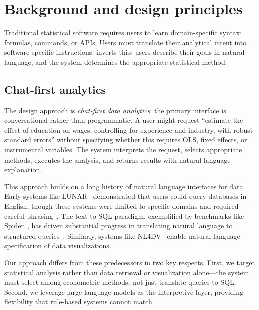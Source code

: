 
\section{Background and design principles} \label{sec:design}

Traditional statistical software requires users to learn domain-specific syntax:
 formulas,  commands, or  APIs.
Users must translate their analytical intent into software-specific instructions.
 inverts this: users describe their goals in natural
language, and the system determines the appropriate statistical method.

\subsection{Chat-first analytics}

The design approach is \emph{chat-first data analytics}:
the primary interface is conversational rather than programmatic. A user
might request ``estimate the effect of education on wages, controlling for
experience and industry, with robust standard errors'' without specifying
whether this requires OLS, fixed effects, or instrumental variables. The
system interprets the request, selects appropriate methods, executes the
analysis, and returns results with natural language explanation.

This approach builds on a long history of natural language interfaces for
data. Early systems like LUNAR~\citep{Woods:1973} demonstrated that users
could query databases in English, though these systems were limited to
specific domains and required careful
phrasing~\citep{Androutsopoulos+etal:1995}. The text-to-SQL paradigm, exemplified
by benchmarks like Spider~\citep{Yu+etal:2018}, has driven substantial
progress in translating natural language to structured
queries~\citep{Li+etal:2024}. Similarly, systems like NL4DV~\citep{Narechania+etal:2021}
enable natural language specification of data visualizations.

Our approach differs from these predecessors in two key respects. First,
we target statistical analysis rather than data retrieval or visualization
alone---the system must select among econometric methods, not just translate
queries to SQL. Second, we leverage large language models as the interpretive
layer, providing flexibility that rule-based systems cannot match.

